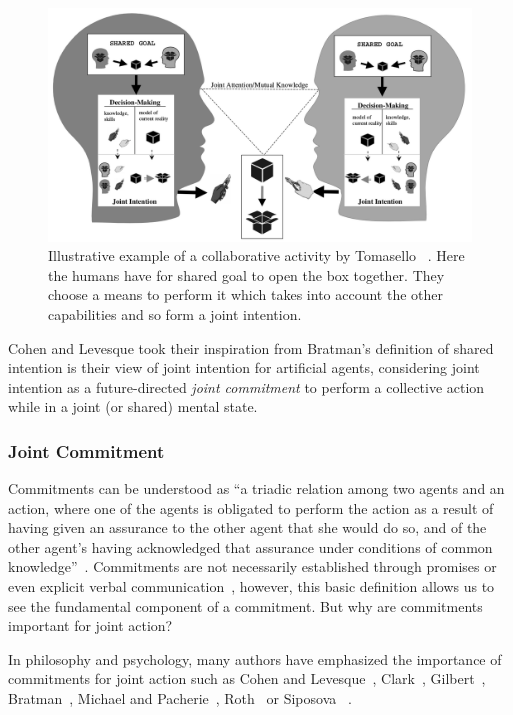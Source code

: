 \documentclass[a4paper,11pt,twoside]{StyleThese}
\begin{document}
 \begin{figure}[!ht]
 	\includegraphics[width=\linewidth]{figures/chapter1/shared_representation.png}
 	\caption{Illustrative example of a collaborative activity by Tomasello \etal~\cite{tomasello_2005_understanding}. Here the humans have for shared goal to open the box together. They choose a means to perform it which takes into account the other capabilities and so form a joint	intention.}
 	\label{chap1:fig:ji}
 \end{figure}

Cohen and Levesque took their inspiration from Bratman's definition of shared intention is their view of joint intention for artificial agents, considering joint intention as a future-directed \textit{joint commitment} to perform a collective action while in a joint (or shared) mental state.

\subsubsection{Joint Commitment}
Commitments can be understood as ``a triadic relation among two agents and an action, where one of the agents is obligated to perform the action as a result of having given an assurance to the other agent that she would do so, and of the other agent’s having acknowledged that assurance under conditions of common knowledge''~\cite[p.~756]{michael_2017_commitment}. Commitments are not necessarily established through promises or even explicit verbal communication~\cite{ledyard_1994_public, scanlon_2000_we, siposova_2018_communicative}, however, this basic definition allows us to see the fundamental component of a commitment. But why are commitments important for joint action?

In philosophy and psychology, many authors have emphasized the importance of commitments for joint action such as Cohen and Levesque~\cite{cohen_1991_teamwork}, Clark~\cite{clark_2006_social}, Gilbert~\cite{gilbert_2009_shared}, Bratman~\cite{bratman_2014_shared}, Michael and Pacherie~\cite{michael_2015_commitments}, Roth~\cite{roth_2014_shared} or Siposova \etal~\cite{siposova_2018_communicative}. 
\end{document}
